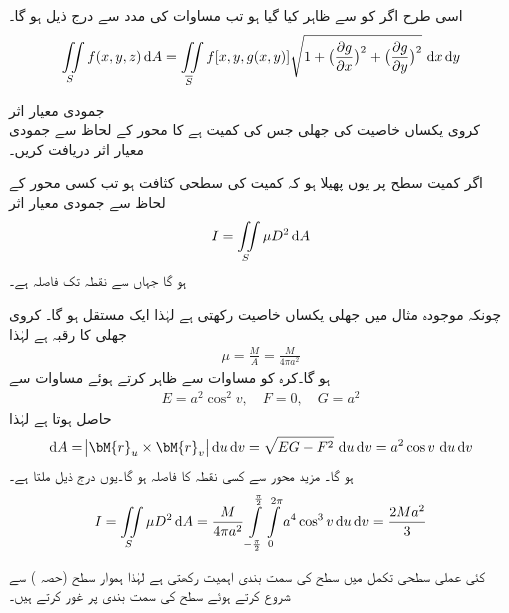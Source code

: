 اسی طرح اگر  کو  سے ظاہر کیا گیا ہو تب مساوات  کی مدد سے درج ذیل ہو گا۔
\begin{align}\label{مساوات_خطی_تکمل_سطحی_تکمل_بطور_دوہرا_ب}
\iint\limits_S f(x,y,z)\dif A=\iint\limits_{\overline{S}} f[x,y,g(x,y)]\sqrt{1+\big(\frac{\partial g}{\partial x}\big)^2+\big(\frac{\partial g}{\partial y}\big)^2}\,\dif x\dif y
\end{align}

\quad جمودی معیار اثر\\
کروی یکساں خاصیت کی جھلی  جس کی کمیت  ہے کا  محور کے لحاظ سے جمودی معیار اثر دریافت کریں۔

اگر کمیت سطح  پر یوں پھیلا ہو کہ کمیت کی سطحی کثافت  ہو تب کسی محور  کے لحاظ سے جمودی معیار اثر
\begin{align}
I=\iint\limits_S \mu D^2\dif A
\end{align}
ہو گا جہاں   سے نقطہ  تک فاصلہ  ہے۔

چونکہ موجودہ مثال میں جھلی یکساں خاصیت رکھتی ہے لہٰذا  ایک مستقل ہو گا۔ کروی جھلی کا رقبہ  ہے لہٰذا
\begin{align*}
\mu=\frac{M}{A}=\frac{M}{4\pi a^2}
\end{align*}
ہو گا۔کرہ کو مساوات  سے ظاہر کرتے ہوئے مساوات  سے
\begin{align*}
E=a^2\cos^2 v,\quad F=0,\quad G=a^2
\end{align*}
حاصل ہوتا ہے لہٰذا
\begin{align*}
\dif A=\abs{\bM{r}_u\times \bM{r}_v}\dif u\dif v=\sqrt{EG-F^2}\,\dif u\dif v=a^2\cos v\,\dif u\dif v
\end{align*}
ہو گا۔ مزید  محور سے کسی نقطہ  کا فاصلہ  ہو گا۔یوں درج ذیل ملتا ہے۔
\begin{align*}
I=\iint\limits_S \mu D^2 \dif A=\frac{M}{4\pi a^2}\int\limits_{-\frac{\pi}{2}}^{\frac{\pi}{2}} \int\limits_{0}^{2\pi} a^4\cos^3 v \dif u\dif v=\frac{2Ma^2}{3}
\end{align*}

کئی عملی سطحی تکمل میں سطح کی سمت بندی اہمیت رکھتی ہے لہٰذا ہموار سطح (حصہ ) سے شروع کرتے ہوئے  سطح کی سمت بندی پر غور کرتے ہیں۔


